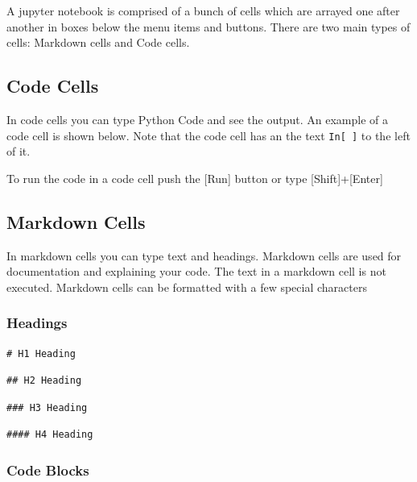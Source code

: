 \documentclass{book}
\begin{document}
A jupyter notebook is comprised of a bunch of cells which are arrayed
one after another in boxes below the menu items and buttons. There are
two main types of cells: Markdown cells and Code cells.
    




    
        \subsection{Code Cells}\label{code-cells}

In code cells you can type Python Code and see the output. An example of
a code cell is shown below. Note that the code cell has an the text
\lstinline!In[ ]! to the left of it.

To run the code in a code cell push the {[}Run{]} button or type
{[}Shift{]}+{[}Enter{]}
    




    
        \subsection{Markdown Cells}\label{markdown-cells}

In markdown cells you can type text and headings. Markdown cells are
used for documentation and explaining your code. The text in a markdown
cell is not executed. Markdown cells can be formatted with a few special
characters

\subsubsection{Headings}\label{headings}

\begin{lstlisting}
# H1 Heading
\end{lstlisting}

\begin{lstlisting}
## H2 Heading
\end{lstlisting}

\begin{lstlisting}
### H3 Heading
\end{lstlisting}

\begin{lstlisting}
#### H4 Heading
\end{lstlisting}

\subsubsection{Code Blocks}\label{code-blocks}
\end{document}
